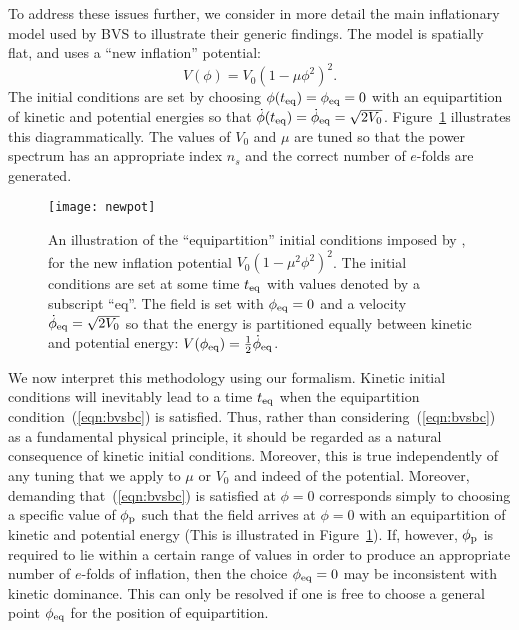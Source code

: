 To address these issues further, we consider in more detail the main inflationary model used by BVS to illustrate their generic findings.  The model is spatially flat, and uses a ``new inflation'' potential:
%
\begin{equation}
  V(\phi) =V_0\left(1-\mu\phi^2\right)^2.
\end{equation}
%
The initial conditions are set by choosing $\phi(t_{\mathrm{eq}})=\phi_{\mathrm{eq}}=0$ with an equipartition of kinetic and potential energies so that $\dot{\phi}(t_{\mathrm{eq}})=\dot{\phi}_{\mathrm{eq}}=\sqrt{2V_0}$.  Figure~\ref{fig:figure_BVS_initial_conditions} illustrates this diagrammatically.  The values of $V_0$ and $\mu$ are tuned so that the power spectrum has an appropriate index $n_s$ and the correct number of $e$-folds are generated.

%
\begin{figure}
  \texttt{[image: newpot]}
  \caption{An illustration of the ``equipartition'' initial conditions imposed by \protect\citet{boyanovsky_cmb_2006}, for the new inflation potential $V_0\left(1-\mu^2\phi^2\right)^2$. The initial conditions are set at some time $t_{\mathrm{eq}}$ with values denoted by a subscript ``eq''. The field is set with $\phi_{\mathrm{eq}}=0$ and a velocity $\dot{\phi}_{\mathrm{eq}}= \sqrt{2V_0}$ so that the energy is partitioned equally between kinetic and potential energy: $V(\phi_{\mathrm{eq}}) = \frac{1}{2}\dot{\phi}_{\mathrm{eq}}$.  }
  \label{fig:figure_BVS_initial_conditions}
\end{figure}
%

We now interpret this methodology using our formalism. Kinetic initial conditions will inevitably lead to a time $t_{\mathrm{eq}}$ when the equipartition condition~(\ref{eqn:bvsbc}) is satisfied. Thus, rather than considering~(\ref{eqn:bvsbc}) as a fundamental physical principle, it should be regarded as a natural consequence of kinetic initial conditions. Moreover, this is true independently of any tuning that we apply to $\mu$ or $V_0$ and indeed of the potential. Moreover, demanding that~(\ref{eqn:bvsbc}) is satisfied at $\phi=0$ corresponds simply to choosing a specific value of $\phi_{\mathrm{p}}$ such that the field arrives at $\phi=0$ with an equipartition of kinetic and potential energy (This is illustrated in Figure~\ref{fig:figure_BVS_initial_conditions}).  If, however, $\phi_{\mathrm{p}}$ is required to lie within a certain range of values in order to produce an appropriate number of $e$-folds of inflation, then the choice $\phi_{\mathrm{eq}}=0$ may be inconsistent with kinetic dominance. This can only be resolved if one is free to choose a general point $\phi_{\mathrm{eq}}$ for the position of equipartition.  

